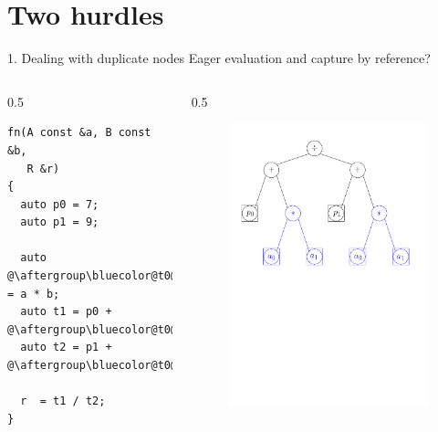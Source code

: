 \documentclass[xcolor=dvipsnames]{beamer}
\begin{document}
\section{Two hurdles}

\begin{frame}[fragile]{1. Dealing with duplicate nodes}
Eager evaluation and capture by reference?
  \begin{columns}[T] %
    \begin{column}{0.5\textwidth}
        \begin{lstlisting}
fn(A const &a, B const &b,
   R &r)
{
  auto p0 = 7;
  auto p1 = 9;

  auto @\aftergroup\bluecolor@t0@\aftergroup\blackcolor@ = a * b;
  auto t1 = p0 + @\aftergroup\bluecolor@t0@\aftergroup\blackcolor@;
  auto t2 = p1 + @\aftergroup\bluecolor@t0@\aftergroup\blackcolor@;

  r  = t1 / t2;
}
  \end{lstlisting}
    \end{column}%
    \hfill%
    \begin{column}{0.5\textwidth}
\begin{figure}[H]
 \centering
 \includegraphics[width=0.99\textwidth]{fig_exprtree_dup}
\end{figure}
    \end{column}%
  \end{columns}
\end{frame}
\end{document}
